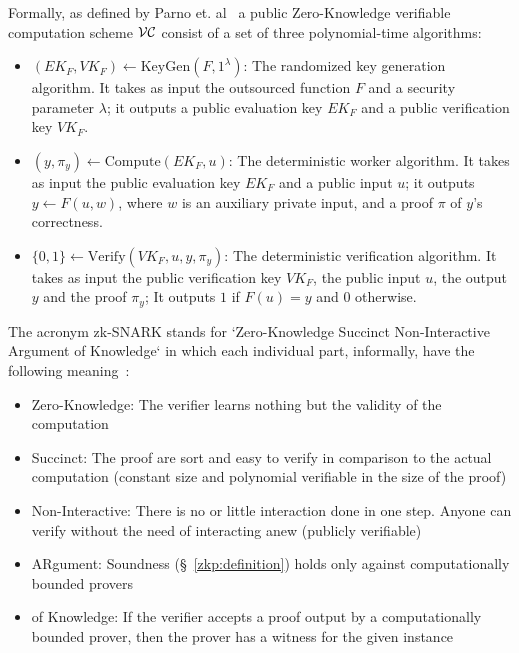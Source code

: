 Formally, as defined by Parno et. al~\cite{pinocchio-nearly-practical-verifiable-computation} a public Zero-Knowledge verifiable computation scheme $\mathcal{V} \mathcal{C}$ consist of a set of three polynomial-time algorithms:

\begin{itemize}
  \item $(EK_F, VK_F) \leftarrow \text{KeyGen}(F, 1^{\lambda})$: The randomized key generation algorithm. It takes as input the outsourced function $F$ and a security parameter ${\lambda}$; it outputs a public evaluation key $EK_F$ and a public verification key $VK_F$.
  \item $(y, \pi_y) \leftarrow \text{Compute}(EK_F, u)$: The deterministic worker algorithm. It takes as input the public evaluation key $EK_F$ and a public input $u$; it outputs $y \leftarrow F(u, w)$, where $w$ is an auxiliary private input, and a proof $\pi$ of $y$'s correctness.
  \item $\{0, 1\} \leftarrow \text{Verify}(VK_F, u, y, \pi_y)$:  The deterministic verification algorithm. It takes as input the public verification key $VK_F$, the public input $u$, the output $y$ and the proof $\pi_y$; It outputs $1$ if $F(u) = y$ and $0$ otherwise.
\end{itemize}

The acronym zk-SNARK stands for `Zero-Knowledge Succinct Non-Interactive Argument of Knowledge` in which each individual part, informally, have the following meaning~\cite{zksnarks_nutshell, zcash, 184425, Bitansky:2012:ECR:2090236.2090263}:

\begin{itemize}
  \item Zero-Knowledge: The verifier learns nothing but the validity of the computation
  \item Succinct: The proof are sort and easy to verify in comparison to the actual computation (constant size and polynomial verifiable in the size of the proof)
  \item Non-Interactive: There is no or little interaction done in one step. Anyone can verify without the need of interacting anew (publicly verifiable)
  \item ARgument: Soundness (§~\ref{zkp:definition}) holds only against computationally bounded provers
  \item of Knowledge: If the verifier accepts a proof output by a computationally bounded prover, then the prover has a witness for the given instance
\end{itemize}

